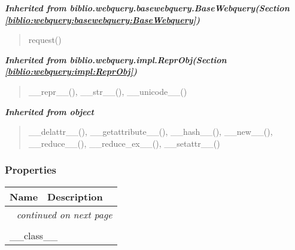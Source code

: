 \large{\textbf{\textit{Inherited from biblio.webquery.basewebquery.BaseWebquery\textit{(Section \ref{biblio:webquery:basewebquery:BaseWebquery})}}}}

\begin{quote}
request()
\end{quote}

\large{\textbf{\textit{Inherited from biblio.webquery.impl.ReprObj\textit{(Section \ref{biblio:webquery:impl:ReprObj})}}}}

\begin{quote}
\_\_repr\_\_(), \_\_str\_\_(), \_\_unicode\_\_()
\end{quote}

\large{\textbf{\textit{Inherited from object}}}

\begin{quote}
\_\_delattr\_\_(), \_\_getattribute\_\_(), \_\_hash\_\_(), \_\_new\_\_(), \_\_reduce\_\_(), \_\_reduce\_ex\_\_(), \_\_setattr\_\_()
\end{quote}


  \subsubsection{Properties}

    \vspace{-1cm}
\hspace{\varindent}\begin{longtable}{|p{\varnamewidth}|p{\vardescrwidth}|l}
\cline{1-2}
\cline{1-2} \centering \textbf{Name} & \centering \textbf{Description}& \\
\cline{1-2}
\endhead\cline{1-2}\multicolumn{3}{r}{\small\textit{continued on next page}}\\\endfoot\cline{1-2}
\endlastfoot\multicolumn{2}{|l|}{\textit{Inherited from object}}\\
\multicolumn{2}{|p{\varwidth}|}{\raggedright \_\_class\_\_}\\
\cline{1-2}
\end{longtable}

